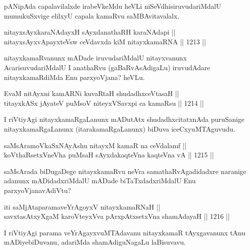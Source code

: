 \begin{artha}
pANipAda capalavilalxde irabeVkeMdu heVLi niSeVdhisiruvudariMdalU mumukuSxvige elilxyU capala kamaRvu saMBAvitavalalx.
\end{artha}

\begin{shl}
nitayxsAyxkaraNAdayxH sAyxdanathaRH karaNAdapi || \\
nitayxsAyxvApayxteV\s sw ceVdavxda kiM nitayxkamaRNA ||  1213 ||  
\end{shl}

\begin{artha}
nitayxkamaRvanunx mADade iruvudariMdalU nitayxvanunx AcarisuvudariMdalU I anathaRvu (gaBaRvAsAdigaLu) iruvudAdare nitayxkamaRdiMda Enu parxyoVjana? heVLu.
\end{artha}

\begin{shl}
EvaM nitAyxni kamARNi kuvaRtaH shudadhxceVtasaH || \\
titayxkASx jAyateV puMsoV niteyxVSavxpi ca kamaRsu ||  1214 ||  
\end{shl}

\begin{artha}
I riVtiyAgi nitayxkamaRgaLanunx mADutAtx shudadhxcitatxnAda puruSanige nitayxkamaRgaLanunx (itarakamaRgaLanunx) biDuva iceCxyuMTAguvudu.
\end{artha}


\begin{shl}
saMsAramoVkaSxNAyA\s \s shu nitayxM kamaR na ceVdalamf || \\
koV\s thaRsetxVneVha puMsaH sAyxdakaqteVna kaqteVna vA ||  1215 ||  
\end{shl}

\begin{artha}
saMsArada biDugaDege nitayxkamaRvu neVra samathaRvAgadidadxre naranige adanunx mADidadxriMdalU mADade biTaTxdadxriMdalU Enu parxyoVjanavAdiVtu?
\end{artha}

\begin{shl}
iti saMjAtaparamaveYrAgoyxV nitayxkamaRNaH || \\
savxtasAtxyXgaM karoVteyxVva pArxpAtxsetxVna shamAdayaH ||  1216 ||  
\end{shl}

\begin{artha}
I riVtiyAgi parama veYrAgayxvuMTAdavanu nitayxkamaR tAyxgavanunx tAnu mADiyebiDuvanu, adariMda shamAdiguNagaLu laBisuvavu.
\end{artha}

